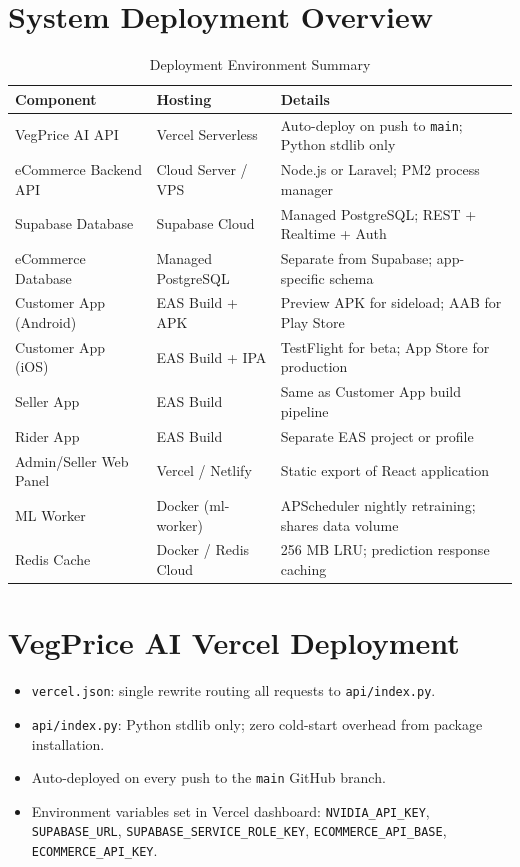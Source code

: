 \documentclass[12pt, a4paper, oneside]{report}
\begin{document}
\section{System Deployment Overview}

\begin{table}[H]
\centering
\caption{Deployment Environment Summary}
\label{tab:deployment}
\begin{tabularx}{\textwidth}{@{} L{3.4cm} L{3.2cm} X @{}}
\toprule
\textbf{Component} & \textbf{Hosting} & \textbf{Details} \\
\midrule
VegPrice AI API        & Vercel Serverless & Auto-deploy on push to \texttt{main}; Python stdlib only \\
eCommerce Backend API  & Cloud Server / VPS & Node.js or Laravel; PM2 process manager \\
Supabase Database      & Supabase Cloud    & Managed PostgreSQL; REST + Realtime + Auth \\
eCommerce Database     & Managed PostgreSQL& Separate from Supabase; app-specific schema \\
Customer App (Android) & EAS Build + APK   & Preview APK for sideload; AAB for Play Store \\
Customer App (iOS)     & EAS Build + IPA   & TestFlight for beta; App Store for production \\
Seller App             & EAS Build         & Same as Customer App build pipeline \\
Rider App              & EAS Build         & Separate EAS project or profile \\
Admin/Seller Web Panel & Vercel / Netlify  & Static export of React application \\
ML Worker              & Docker (ml-worker)& APScheduler nightly retraining; shares data volume \\
Redis Cache            & Docker / Redis Cloud & 256 MB LRU; prediction response caching \\
\bottomrule
\end{tabularx}
\end{table}

\section{VegPrice AI Vercel Deployment}

\begin{itemize}
  \item \texttt{vercel.json}: single rewrite routing all requests to
        \texttt{api/index.py}.
  \item \texttt{api/index.py}: Python stdlib only; zero cold-start overhead
        from package installation.
  \item Auto-deployed on every push to the \texttt{main} GitHub branch.
  \item Environment variables set in Vercel dashboard:
        \texttt{NVIDIA\_API\_KEY}, \texttt{SUPABASE\_URL},
        \texttt{SUPABASE\_SERVICE\_ROLE\_KEY},
        \texttt{ECOMMERCE\_API\_BASE}, \texttt{ECOMMERCE\_API\_KEY}.
\end{itemize}
\end{document}
